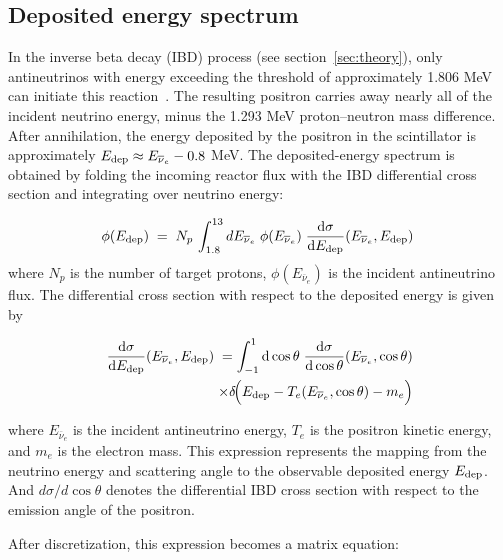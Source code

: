 \documentclass[xetex,twocolumn,epjc3]{svjour3}
\begin{document}
\subsection{Deposited energy spectrum}  
\label{sec:Deposited energy spectrum}
In the inverse beta decay (IBD) process (see section~\ref{sec:theory}), only antineutrinos with energy exceeding the threshold of approximately 1.806 MeV can initiate this reaction~\cite{Ludhova2023JUNO}. The resulting positron carries away nearly all of the incident neutrino energy, minus the 1.293 MeV proton–neutron mass difference. After annihilation, the energy deposited by the positron in the scintillator is approximately $E_{\rm dep} \approx E_{\overline{\nu}_e} - 0.8$ MeV.  The deposited-energy spectrum is obtained by folding the incoming reactor flux with the IBD differential cross section and integrating over neutrino energy:

\begin{equation}
\label{eq:continuous_rate}
\phi(E_{\rm dep}) \;=\; N_p \,  \int_{1.8}^{13} dE_{\overline{\nu}_e}\; \phi(E_{\overline{\nu}_e}) \; \frac{{\rm d}\sigma}{{\rm d}E_{\rm dep}}(E_{\overline{\nu}_e}, E_{\rm dep})  \; 
\end{equation}
\noindent where $N_p$ is the number of target protons, $\phi(E_{\overline{\nu}_e})$ is the incident antineutrino flux. The differential cross section with respect to the deposited energy is given by

\begin{equation}
\begin{split}
\frac{{\rm d}\sigma}{{\rm d}E_{\rm dep}}(E_{\overline{\nu}_e}, E_{\rm dep}) \;=
\int_{-1}^{1} {\rm d}\cos\theta \;  
\frac{{\rm d}\sigma}{{\rm d}\cos\theta}(E_{\overline{\nu}_e},\cos\theta) \\ \;  
\times \delta\!\Big(E_{\rm dep}-T_e(E_{\overline{\nu}_e},\cos\theta)-m_e\Big)
\end{split}
\end{equation}


\noindent where $E_{\overline{\nu}_e}$ is the incident antineutrino energy, $T_e$ is the positron kinetic energy, and $m_e$ is the electron mass. This expression represents the mapping from the neutrino energy and scattering angle to the observable deposited energy $E_{\rm dep}$. And $d\sigma/d\cos\theta$ denotes the differential IBD cross section with respect to the emission angle of the positron. 

After discretization, this expression becomes a matrix equation:
\end{document}
